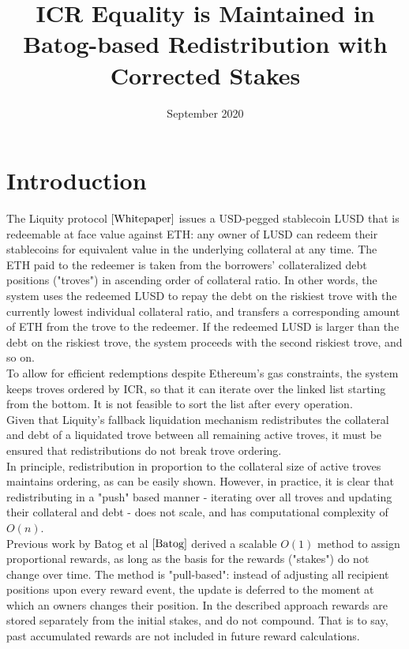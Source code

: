 \documentclass[reqno]{article}
\begin{document}
\title{\textbf{ICR Equality is Maintained in Batog-based Redistribution with Corrected Stakes}}
\date{September 2020}
\maketitle

\tableofcontents

\section{Introduction}


The Liquity protocol $\cite{Whitepaper}$ issues a USD-pegged stablecoin LUSD that is redeemable at face value against ETH: any owner of LUSD can redeem their stablecoins for equivalent value in the underlying collateral at any time. The ETH paid to the redeemer is taken from the borrowers' collateralized debt positions ("troves") in ascending order of collateral ratio. In other words, the system uses the redeemed LUSD to repay the debt on the riskiest trove with the currently lowest individual collateral ratio, and transfers a corresponding amount of ETH from the trove to the redeemer. If the redeemed LUSD is larger than the debt on the riskiest trove, the system proceeds with the second riskiest trove, and so on. \\

To allow for efficient redemptions despite Ethereum's gas constraints, the system keeps troves ordered by ICR, so that it can iterate over the linked list starting from the bottom. It is not feasible to sort the list after every operation. \\

Given that Liquity's fallback liquidation mechanism redistributes the collateral and debt of a liquidated trove between all remaining active troves, it must be  ensured that redistributions do not break trove ordering. \\

In principle, redistribution in proportion to the collateral size of active troves maintains ordering, as can be easily shown. However, in practice, it is clear that redistributing in a "push" based manner - iterating over all troves and updating their collateral and debt - does not scale, and has computational complexity of $O(n)$. \\

Previous work by Batog et al $\cite{Batog}$ derived a scalable $O(1)$ method to assign proportional rewards, as long as the basis for the rewards ("stakes") do not change over time. The method is "pull-based": instead of adjusting all recipient positions upon every reward event, the update is deferred to the moment at which an owners changes their position. In the described approach rewards are stored separately from the initial stakes, and do not compound. That is to say, past accumulated rewards are not included in future reward calculations. \\
\end{document}
